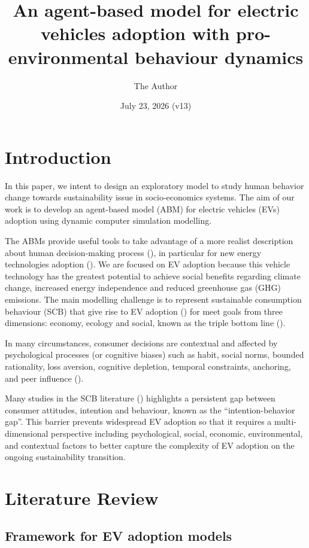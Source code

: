\documentclass[11pt]{article}
\title{An agent-based model for electric vehicles adoption with
pro-environmental behaviour dynamics}
\author{The Author}
\date{July 23, 2026 (v13)}
\begin{document}
\maketitle

\section{Introduction}

In this paper, we intent to design an exploratory model to study human
behavior change towards sustainability issue in socio-economics systems. The
aim of our work is to develop an agent-based model (ABM) for electric
vehicles (EVs) adoption using dynamic computer simulation modelling.

The ABMs provide useful tools to take advantage of a more realist description
about human decision-making process (\cite{bonabeau2002}), in particular for
new energy technologies adoption (\cite{rai2016}). We are focused on EV
adoption because this vehicle technology has the greatest potential to
achieve social benefits regarding climate change, increased energy
independence and reduced greenhouse gas (GHG) emissions. The main modelling
challenge is to represent sustainable consumption behaviour (SCB) that give
rise to EV adoption (\cite{nielsen2024}) for meet goals from three
dimensions: economy, ecology and social, known as the triple bottom line
(\cite{elkington1997}).

In many circumstances, consumer decisions are contextual and affected by
psychological processes (or cognitive biases) such as habit, social norms,
bounded rationality, loss aversion, cognitive depletion, temporal
constraints, anchoring, and peer influence (\cite{orourke2015}).

Many studies in the SCB literature (\cite{syed2024}) highlights a persistent
gap between consumer attitudes, intention and behaviour, known as the
``intention-behavior gap''. This barrier prevents widespread EV adoption so
that it requires a multi-dimensional perspective including psychological,
social, economic, environmental, and contextual factors to better capture
the complexity of EV adoption on the ongoing sustainability transition.

\section{Literature Review}
\subsection{Framework for EV adoption models}
\end{document}
